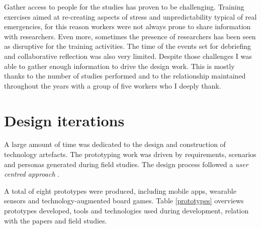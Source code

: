 Gather access to people for the studies has proven to be challenging.
Training exercises aimed at re-creating aspects of stress and
unpredictability typical of real emergencies, for this reason workers
were not always prone to share information with researchers. Even more,
sometimes the presence of researchers has been seen as disruptive for
the training activities. The time of the events set for debriefing and
collaborative reflection was also very limited. Despite those challenges
I was able to gather enough information to drive the design work. This
is mostly thanks to the number of studies performed and to the
relationship maintained throughout the years with a group of five
workers who I deeply
thank.

\section{Design iterations}\label{design-iterations}

A large amount of time was dedicated to the design and construction of
technology artefacts. The prototyping work was driven by requirements,
scenarios and personas generated during field studies. The design
process followed a \emph{user centred approach}
\autocites{MAGUIRE:2001dp}{Gulliksen:2003hd}.

A total of eight prototypes were produced, including mobile apps,
wearable sensors and technology-augmented board games. Table
\ref{prototypes} overviews prototypes developed, tools and technologies
used during development, relation with the papers and field studies.

